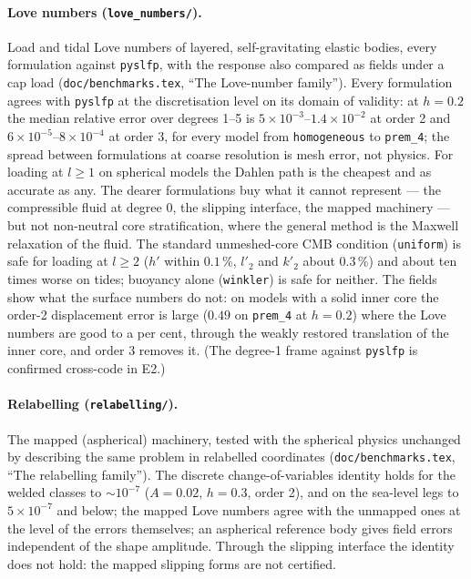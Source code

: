 \documentclass[11pt]{article}
\numberwithin{equation}{section}
\newcommand{\code}[1]{\texttt{#1}}
\begin{document}
\paragraph{Love numbers (\code{love\_numbers/}).} Load and tidal Love
numbers of layered, self-gravitating elastic bodies, every formulation
against \code{pyslfp}, with the response also compared as fields under a cap
load (\code{doc/benchmarks.tex}, ``The Love-number family''). Every
formulation agrees with \code{pyslfp} at the discretisation level on its
domain of validity: at $h=0.2$ the median relative error over degrees 1--5
is $5\times10^{-3}$--$1.4\times10^{-2}$ at order 2 and
$6\times10^{-5}$--$8\times10^{-4}$ at order 3, for every model from
\code{homogeneous} to \code{prem\_4}; the spread between formulations at
coarse resolution is mesh error, not physics. For loading at $l\ge1$ on
spherical models the Dahlen path is the cheapest and as accurate as any.
The dearer formulations buy what it cannot represent --- the compressible
fluid at degree 0, the slipping interface, the mapped machinery --- but not
non-neutral core stratification, where the general method is the Maxwell
relaxation of the fluid. The standard unmeshed-core CMB condition
(\code{uniform}) is safe for loading at $l\ge2$ ($h'$ within $0.1\,\%$,
$l'_2$ and $k'_2$ about $0.3\,\%$) and about ten times worse on tides;
buoyancy alone (\code{winkler}) is safe for neither. The fields show what the
surface numbers do not: on models with a solid inner core the order-2
displacement error is large ($0.49$ on \code{prem\_4} at $h=0.2$) where the
Love numbers are good to a per cent, through the weakly restored
translation of the inner core, and order 3 removes it. (The degree-1
frame against \code{pyslfp} is confirmed cross-code in E2.)

\paragraph{Relabelling (\code{relabelling/}).} The mapped (aspherical)
machinery, tested with the spherical physics unchanged by describing the
same problem in relabelled coordinates \cite{AlAttarCrawford2016}
(\code{doc/benchmarks.tex}, ``The relabelling family''). The discrete
change-of-variables identity holds for the welded classes to
$\sim10^{-7}$ ($A=0.02$, $h=0.3$, order 2), and on the sea-level legs to
$5\times10^{-7}$ and below; the mapped Love numbers agree with the unmapped
ones at the level of the errors themselves; an aspherical reference body
gives field errors independent of the shape amplitude. Through the
slipping interface the identity does not hold: the mapped slipping forms are
not certified.
\end{document}
